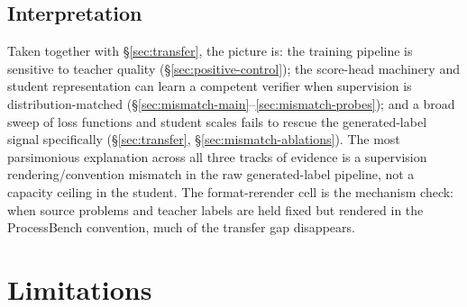 \documentclass[11pt]{article}
\begin{document}
\begin{table}[t]
\centering
\small
{}
\caption{Preliminary generated-label ablations on the Qwen2.5-3B score-head
path (condensed; full 10-row table in the appendix).}
\label{tab:mismatch-ablations}
\end{table}

\subsection{Interpretation}
Taken together with \S\ref{sec:transfer}, the picture is: the training
pipeline is sensitive to teacher quality (\S\ref{sec:positive-control}); the
score-head machinery and student representation can learn a competent
verifier when supervision is distribution-matched
(\S\ref{sec:mismatch-main}--\ref{sec:mismatch-probes}); and a broad sweep of
loss functions and student scales fails to rescue the generated-label
signal specifically (\S\ref{sec:transfer}, \S\ref{sec:mismatch-ablations}).
The most parsimonious explanation across all three tracks of evidence is a
supervision rendering/convention mismatch in the raw generated-label pipeline,
not a capacity ceiling in the student. The format-rerender cell is the
mechanism check: when source problems and teacher labels are held fixed but
rendered in the ProcessBench convention, much of the transfer gap disappears.

\section{Limitations}
\label{sec:limitations}
\end{document}
